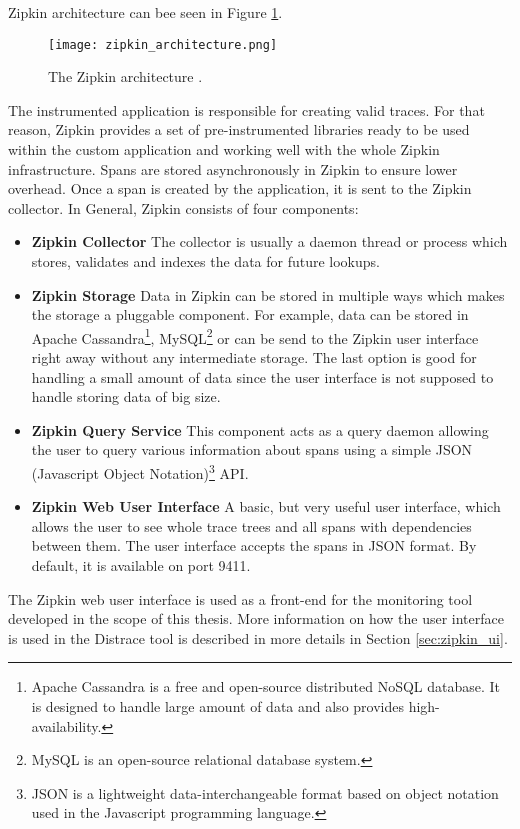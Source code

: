 Zipkin architecture can bee seen in Figure \ref{fig:zipkin_architecture}.
\begin{figure}
	\centering
	\texttt{[image: zipkin\_architecture.png]}
	\caption{The Zipkin architecture \cite{ZipkinImage}.}
	\label{fig:zipkin_architecture}
\end{figure}
The instrumented application is responsible for creating valid traces. For that reason, Zipkin provides a set of pre-instrumented libraries ready to be used within the custom application and working well with the whole Zipkin infrastructure. Spans are stored asynchronously in Zipkin to ensure lower overhead. Once a span is created by the application, it is sent to the Zipkin collector. In General, Zipkin consists of four components:
\begin{itemize}
	\item \textbf{Zipkin Collector} \newline
	The collector is usually a daemon thread or process which stores, validates and indexes the data for future lookups.
	\item\textbf{Zipkin Storage} \newline
	Data in Zipkin can be stored in multiple ways which makes the storage a pluggable component. For example, data can be stored in Apache Cassandra\footnote{Apache Cassandra is a free and open-source distributed NoSQL database. It is designed to handle large amount of data and also provides high-availability.}, MySQL\footnote{MySQL is an open-source relational database system.} or can be send to the Zipkin user interface right away without any intermediate storage. The last option is good for handling a small amount of data since the user interface is not supposed to handle storing data of big size.
	\item \textbf{Zipkin Query Service} \newline
	This component acts as a query daemon allowing the user to query various information about spans using a simple JSON (Javascript Object Notation)\footnote{JSON is a lightweight data-interchangeable format based on object notation used in the Javascript programming language.} API.
	\item \textbf{Zipkin Web User Interface} \newline
	A basic, but very useful user interface, which allows the user to see whole trace trees and all spans with dependencies between them. The user interface accepts the spans in JSON format. By default, it is available on port 9411.
\end{itemize}
The Zipkin web user interface is used as a front-end for the monitoring tool developed in the scope of this thesis. More information on how the user interface is used in the Distrace tool is described in more details in Section \ref{sec:zipkin_ui}.
